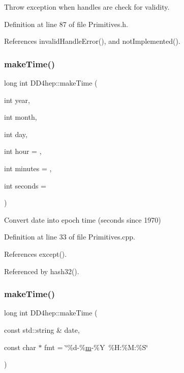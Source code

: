 Throw exception when handles are check for validity. 



Definition at line 87 of file Primitives.\+h.



References invalid\+Handle\+Error(), and not\+Implemented().

\hypertarget{namespace_d_d4hep_ae99d8100ffc43cc104f89aae55187f11}{}\label{namespace_d_d4hep_ae99d8100ffc43cc104f89aae55187f11} 
\subsubsection{\texorpdfstring{make\+Time()}{makeTime()}\hspace{0.1cm}{\footnotesize\ttfamily [1/2]}}
{\footnotesize\ttfamily long int D\+D4hep\+::make\+Time (\begin{DoxyParamCaption}\item[{int}]{year,  }\item[{int}]{month,  }\item[{int}]{day,  }\item[{int}]{hour = {},  }\item[{int}]{minutes = {},  }\item[{int}]{seconds = {} }\end{DoxyParamCaption})}



Convert date into epoch time (seconds since 1970) 



Definition at line 33 of file Primitives.\+cpp.



References except().



Referenced by hash32().

\hypertarget{namespace_d_d4hep_adf6475d1fb2f6f99ec94fd7bbcae5e49}{}\label{namespace_d_d4hep_adf6475d1fb2f6f99ec94fd7bbcae5e49} 
\subsubsection{\texorpdfstring{make\+Time()}{makeTime()}\hspace{0.1cm}{\footnotesize\ttfamily [2/2]}}
{\footnotesize\ttfamily long int D\+D4hep\+::make\+Time (\begin{DoxyParamCaption}\item[{const std\+::string \&}]{date,  }\item[{const char $\ast$}]{fmt = {\ttfamily \char`\"{}\%d-\/\%\hyperlink{_volumes_8cpp_a6fc379aaec47ce424b00d8ffda2a6c59}{m}-\/\%Y~\%H\+:\%M\+:\%S\char`\"{}} }\end{DoxyParamCaption})}



